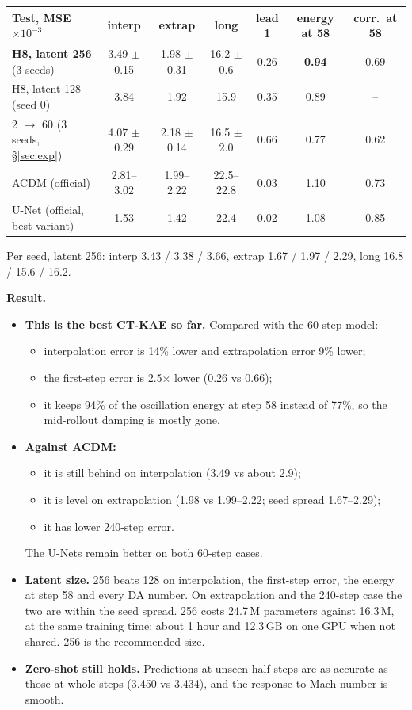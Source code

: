 \begin{center}\small
\begin{tabular}{lcccccc}
\toprule
Test, MSE $\times10^{-3}$ & interp & extrap & long & lead 1 & energy at 58 & corr.\ at 58\\
\midrule
\textbf{H8, latent 256} (3 seeds) & 3.49 $\pm$ 0.15 & 1.98 $\pm$ 0.31 & 16.2 $\pm$ 0.6 & 0.26 & \textbf{0.94} & 0.69\\
H8, latent 128 (seed 0)           & 3.84 & 1.92 & 15.9 & 0.35 & 0.89 & --\\
2 $\to$ 60 (3 seeds, \S\ref{sec:exp}) & 4.07 $\pm$ 0.29 & 2.18 $\pm$ 0.14 & 16.5 $\pm$ 2.0 & 0.66 & 0.77 & 0.62\\
ACDM (official)                   & 2.81--3.02 & 1.99--2.22 & 22.5--22.8 & 0.03 & 1.10 & 0.73\\
U-Net (official, best variant)    & 1.53 & 1.42 & 22.4 & 0.02 & 1.08 & 0.85\\
\bottomrule
\end{tabular}
\end{center}
{\footnotesize Per seed, latent 256: interp 3.43 / 3.38 / 3.66, extrap 1.67 / 1.97 / 2.29,
long 16.8 / 15.6 / 16.2.}

\textbf{Result.}
\begin{itemize}
\item \textbf{This is the best CT-KAE so far.} Compared with the 60-step model:
  \begin{itemize}
  \item interpolation error is 14\% lower and extrapolation error 9\% lower;
  \item the first-step error is 2.5$\times$ lower (0.26 vs 0.66);
  \item it keeps 94\% of the oscillation energy at step 58 instead of 77\%, so the
    mid-rollout damping is mostly gone.
  \end{itemize}
\item \textbf{Against ACDM:}
  \begin{itemize}
  \item it is still behind on interpolation (3.49 vs about 2.9);
  \item it is level on extrapolation (1.98 vs 1.99--2.22; seed spread 1.67--2.29);
  \item it has lower 240-step error.
  \end{itemize}
  The U-Nets remain better on both 60-step cases.
\item \textbf{Latent size.} 256 beats 128 on interpolation, the first-step error, the energy at
  step 58 and every DA number. On extrapolation and the 240-step case the two are within the
  seed spread. 256 costs 24.7\,M parameters against 16.3\,M, at the same training time: about
  1 hour and 12.3\,GB on one GPU when not shared. 256 is the recommended size.
\item \textbf{Zero-shot still holds.} Predictions at unseen half-steps are as accurate as those
  at whole steps (3.450 vs 3.434), and the response to Mach number is smooth.
\end{itemize}

